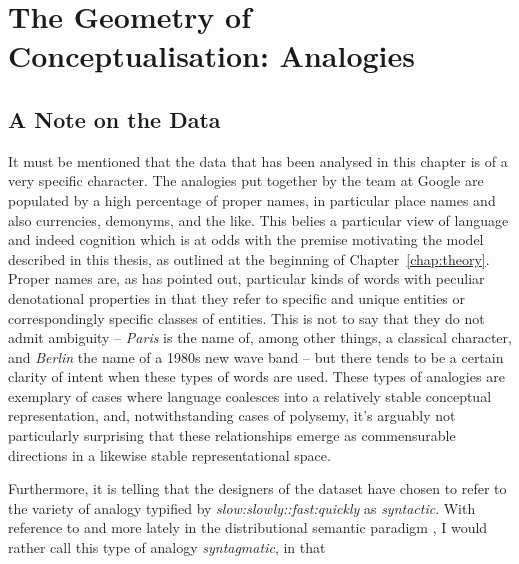 \chapter{The Geometry of Conceptualisation: Analogies} \label{chap:analogy}
\begin{table}
\begin{tabular}

\end{tabular}
\end{table}

\section{A Note on the Data}
It must be mentioned that the data that has been analysed in this chapter is of a very specific character.  The analogies put together by the team at Google are populated by a high percentage of proper names, in particular place names and also currencies, demonyms, and the like.  This belies a particular view of language and indeed cognition which is at odds with the premise motivating the model described in this thesis, as outlined at the beginning of Chapter~\ref{chap:theory}.  Proper names are, as \cite{Russell} has pointed out, particular kinds of words with peculiar denotational properties in that they refer to specific and unique entities or correspondingly specific classes of entities.  This is not to say that they do not admit ambiguity -- \emph{Paris} is the name of, among other things, a classical character, and \emph{Berlin} the name of a 1980s new wave band -- but there tends to be a certain clarity of intent when these types of words are used.  These types of analogies are exemplary of cases where language coalesces into a relatively stable conceptual representation, and, notwithstanding cases of polysemy, it's arguably not particularly surprising that these relationships emerge as commensurable directions in a likewise stable representational space.

Furthermore, it is telling that the designers of the dataset have chosen to refer to the variety of analogy typified by \emph{slow:slowly::fast:quickly} as \emph{syntactic}.  With reference to \cite{Saussure} and more lately in the distributional semantic paradigm \cite{Sahlgren}, I would rather call this type of analogy \emph{syntagmatic}, in that 
